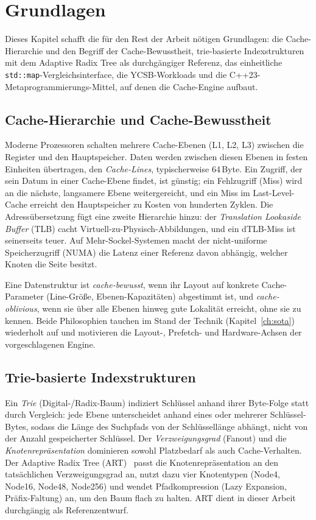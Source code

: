 \chapter{Grundlagen}\label{ch:fundamentals}

Dieses Kapitel schafft die für den Rest der Arbeit nötigen Grundlagen: die Cache-Hierarchie
und den Begriff der Cache-Bewusstheit, trie-basierte Indexstrukturen mit dem Adaptive Radix
Tree als durchgängiger Referenz, das einheitliche \texttt{std::map}-Vergleichsinterface, die
YCSB-Workloads und die C++23-Metaprogrammierungs-Mittel, auf denen die Cache-Engine aufbaut.

\section{Cache-Hierarchie und Cache-Bewusstheit}\label{sec:cache-basics}

Moderne Prozessoren schalten mehrere Cache-Ebenen (L1, L2, L3) zwischen die Register und den
Hauptspeicher. Daten werden zwischen diesen Ebenen in festen Einheiten übertragen, den
\emph{Cache-Lines}, typischerweise 64\,Byte. Ein Zugriff, der sein Datum in einer Cache-Ebene
findet, ist günstig; ein Fehlzugriff (Miss) wird an die nächste, langsamere Ebene
weitergereicht, und ein Miss im Last-Level-Cache erreicht den Hauptspeicher zu Kosten von
hunderten Zyklen. Die Adressübersetzung fügt eine zweite Hierarchie hinzu: der
\emph{Translation Lookaside Buffer} (TLB) cacht Virtuell-zu-Physisch-Abbildungen, und ein
dTLB-Miss ist seinerseits teuer. Auf Mehr-Sockel-Systemen macht der nicht-uniforme
Speicherzugriff (NUMA) die Latenz einer Referenz davon abhängig, welcher Knoten die Seite
besitzt.

Eine Datenstruktur ist \emph{cache-bewusst}, wenn ihr Layout auf konkrete Cache-Parameter
(Line-Größe, Ebenen-Kapazitäten) abgestimmt ist, und \emph{cache-oblivious}, wenn sie über
alle Ebenen hinweg gute Lokalität erreicht, ohne sie zu kennen. Beide Philosophien tauchen im
Stand der Technik (Kapitel~\ref{ch:sota}) wiederholt auf und motivieren die Layout-, Prefetch-
und Hardware-Achsen der vorgeschlagenen Engine.

\section{Trie-basierte Indexstrukturen}\label{sec:trie-basics}

Ein \emph{Trie} (Digital-/Radix-Baum) indiziert Schlüssel anhand ihrer Byte-Folge statt durch
Vergleich: jede Ebene unterscheidet anhand eines oder mehrerer Schlüssel-Bytes, sodass die
Länge des Suchpfads von der Schlüssellänge abhängt, nicht von der Anzahl gespeicherter
Schlüssel. Der \emph{Verzweigungsgrad} (Fanout) und die \emph{Knotenrepräsentation} dominieren
sowohl Platzbedarf als auch Cache-Verhalten. Der Adaptive Radix Tree
(ART)~\cite{leis2013art} passt die Knotenrepräsentation an den tatsächlichen Verzweigungsgrad
an, nutzt dazu vier Knotentypen (Node4, Node16, Node48, Node256) und wendet Pfadkompression
(Lazy Expansion, Präfix-Faltung) an, um den Baum flach zu halten. ART dient in dieser Arbeit
durchgängig als Referenzentwurf.


